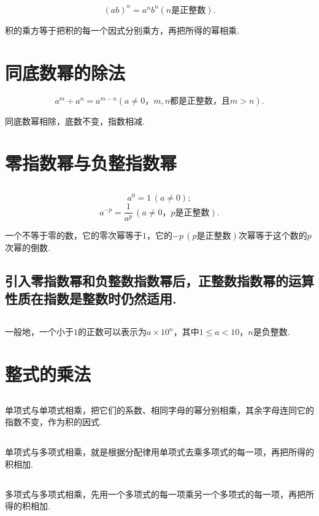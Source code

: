 \documentclass[fontset=windows]{ctexrep}
\begin{document}
\subsection{}
\[(ab)^n=a^nb^n(n是正整数).\]
\par 积的乘方等于把积的每一个因式分别乘方，再把所得的幂相乘.
\section{同底数幂的除法}
\[a^m\div a^n=a^{m-n}(a\neq 0，m,n都是正整数，且m>n).\]
\par 同底数幂相除，底数不变，指数相减.
\section{零指数幂与负整指数幂}
\subsection{}
\[a^0=1\,(a\neq 0); \]
\[a^{-p}=\dfrac{1}{a^p}\,(a\neq 0，p是正整数).\]
\par 一个不等于零的数，它的零次幂等于$1$，它的$-p\,(p是正整数)$次幂等于这个数的$p$次幂的倒数.
\subsection{引入零指数幂和负整数指数幂后，正整数指数幂的运算性质在指数是整数时仍然适用.}
\subsection{}
\par 一般地，一个小于$1$的正数可以表示为$a\times 10^n$，其中$1\leqslant a<10，n$是负整数.
\section{整式的乘法}
\subsection{}
\par 单项式与单项式相乘，把它们的系数、相同字母的幂分别相乘，其余字母连同它的指数不变，作为积的因式.
\subsection{}
\par 单项式与多项式相乘，就是根据分配律用单项式去乘多项式的每一项，再把所得的积相加.
\subsection{}
\par 多项式与多项式相乘，先用一个多项式的每一项乘另一个多项式的每一项，再把所得的积相加.
\end{document}
